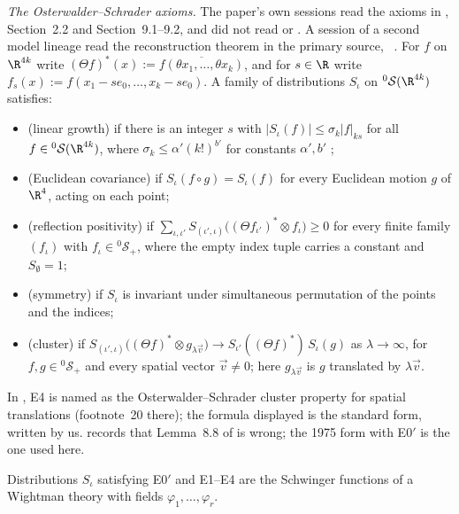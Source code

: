 \emph{The Osterwalder--Schrader axioms.} The paper's own sessions read the axioms in \cite{KQR21}, Section~2.2 and Section~9.1--9.2, and did not read \cite{OS73} or \cite{OS75}. A session of a second model lineage read the reconstruction theorem in the primary source, \cite[Section~IV.1]{OS75}~\cite[comments 7104829352, 7105100783]{RepoThread}. For $f$ on $\R^{4k}$ write $(\Theta f)^*(x):=\overline{f(\theta x_1,\dots,\theta x_k)}$, and for $s\in\R$ write $f_s(x):=f(x_1-se_0,\dots,x_k-se_0)$. A family of distributions $S_\iota$ on ${}^0\mathcal S(\R^{4k})$ satisfies:
\begin{itemize}
\item[E0$'$] (linear growth) if there is an integer $s$ with $|S_\iota(f)|\le\sigma_k|f|_{ks}$ for all $f\in{}^0\mathcal S(\R^{4k})$, where $\sigma_k\le\alpha'(k!)^{b'}$ for constants $\alpha',b'$ \cite[eq.~(9.18)]{KQR21};
\item[E1] (Euclidean covariance) if $S_\iota(f\circ g)=S_\iota(f)$ for every Euclidean motion $g$ of $\R^4$, acting on each point;
\item[E2] (reflection positivity) if $\sum_{\iota,\iota'}S_{(\iota',\iota)}\bigl((\Theta f_{\iota'})^*\otimes f_\iota\bigr)\ge0$ for every finite family $(f_\iota)$ with $f_\iota\in{}^0\mathcal S_+$, where the empty index tuple carries a constant and $S_\emptyset=1$;
\item[E3] (symmetry) if $S_\iota$ is invariant under simultaneous permutation of the points and the indices;
\item[E4] (cluster) if $S_{(\iota',\iota)}\bigl((\Theta f)^*\otimes g_{\lambda\vec v}\bigr)\to S_{\iota'}((\Theta f)^*)\,S_\iota(g)$ as $\lambda\to\infty$, for $f,g\in{}^0\mathcal S_+$ and every spatial vector $\vec v\ne0$; here $g_{\lambda\vec v}$ is $g$ translated by $\lambda\vec v$.
\end{itemize}
In \cite{KQR21}, E4 is named as the Osterwalder--Schrader cluster property for spatial translations (footnote~20 there); the formula displayed is the standard form, written by us. \cite[Section~9.2.1]{KQR21} records that Lemma~8.8 of \cite{OS73} is wrong; the 1975 form with E0$'$ is the one used here.

\begin{theorem}\label{red:OS}
Distributions $S_\iota$ satisfying E0$'$ and E1--E4 are the Schwinger functions of a Wightman theory with fields $\varphi_1,\dots,\varphi_r$.
\end{theorem}

